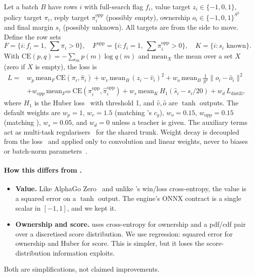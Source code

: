 Let a batch $B$ have rows $i$ with full-search flag $f_i$, value target $z_i\in\{-1,0,1\}$,
policy target $\pi_i$, reply target $\pi^{\mathrm{opp}}_i$ (possibly empty), ownership
$o_i\in\{-1,0,1\}^{S^2}$ and final margin $s_i$ (possibly unknown). All targets are from
the side to move. Define the row sets
\begin{equation*}
  F = \{i : f_i = 1,\ \textstyle\sum\pi_i > 0\},\quad
  F^{\mathrm{opp}} = \{i : f_i = 1,\ \textstyle\sum\pi^{\mathrm{opp}}_i > 0\},\quad
  K = \{i : s_i \text{ known}\}.
\end{equation*}
With $\mathrm{CE}(p,q) = -\sum_m p(m)\log q(m)$ and $\mathrm{mean}_X$ the mean over a set
$X$ (zero if $X$ is empty), the loss is
\begin{align}
  L ={}& w_p\,\mathrm{mean}_{F}\,\mathrm{CE}(\pi_i,\hat\pi_i)
       + w_v\,\mathrm{mean}_{B}\,(z_i-\hat v_i)^2
       + w_o\,\mathrm{mean}_{B}\,\tfrac{1}{S^2}\lVert o_i-\hat o_i\rVert^2 \nonumber\\
      &+ w_{\mathrm{opp}}\,\mathrm{mean}_{F^{\mathrm{opp}}}\,\mathrm{CE}(\pi^{\mathrm{opp}}_i,\hat\pi^{\mathrm{opp}}_i)
       + w_s\,\mathrm{mean}_{K}\,H_1\!\left(\hat s_i - s_i/20\right)
       + w_d\,L_{\mathrm{distill}},
  \label{eq:loss}
\end{align}
where $H_1$ is the Huber loss~\citep{huber1964robust} with threshold 1, and
$\hat v,\hat o$ are $\tanh$ outputs. The default weights are $w_p=1$, $w_v=1.5$ (matching
\katago{}'s $c_g$), $w_o=0.15$, $w_{\mathrm{opp}}=0.15$ (matching \katago{}), $w_s=0.05$,
and $w_d=0$ unless a teacher is given. The auxiliary terms act as multi-task
regularisers~\citep{caruana1997multitask} for the shared trunk. Weight decay is decoupled from the
loss~\citep{loshchilov2019decoupled} and applied only to convolution and linear weights,
never to biases or batch-norm parameters~\citep{ioffe2015batch}.

\paragraph{How this differs from \katago{}.}
\begin{itemize}
  \item \textbf{Value.} Like AlphaGo Zero~\citep{silver2017mastering} and unlike \katago{}'s
        win/loss cross-entropy, the value is a squared error on a $\tanh$ output. The
        engine's ONNX contract is a single scalar in $[-1,1]$, and we kept it.
  \item \textbf{Ownership and score.} \katago{} uses cross-entropy for ownership and a
        pdf/cdf pair over a discretised score distribution. We use regression: squared
        error for ownership and Huber for score. This is simpler, but it loses the
        score-distribution information \katago{} exploits.
\end{itemize}
Both are simplifications, not claimed improvements.

